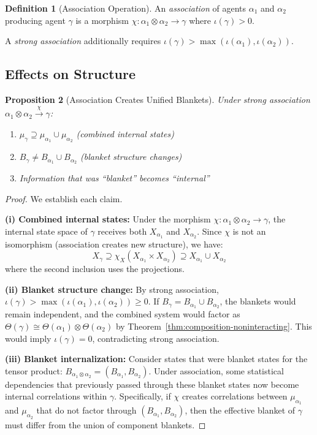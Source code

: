 \documentclass[11pt,a4paper]{article}
\theoremstyle{definition}
\newtheorem{definition}{Definition}[section]
\theoremstyle{plain}
\newtheorem{proposition}[definition]{Proposition}
\theoremstyle{remark}
\begin{document}
\begin{definition}[Association Operation]\label{def:association-op}
An \emph{association} of agents $\alpha_1$ and $\alpha_2$ producing agent $\gamma$ is a morphism $\chi: \alpha_1 \otimes \alpha_2 \to \gamma$ where $\iota(\gamma) > 0$.

A \emph{strong association} additionally requires $\iota(\gamma) > \max(\iota(\alpha_1), \iota(\alpha_2))$.
\end{definition}

\subsection{Effects on Structure}

\begin{proposition}[Association Creates Unified Blankets]\label{prop:blanket-merging}
Under strong association $\alpha_1 \otimes \alpha_2 \xrightarrow{\chi} \gamma$:
\begin{enumerate}[label=(\roman*)]
    \item $\mu_\gamma \supseteq \mu_{\alpha_1} \cup \mu_{\alpha_2}$ (combined internal states)
    \item $B_\gamma \neq B_{\alpha_1} \cup B_{\alpha_2}$ (blanket structure changes)
    \item Information that was ``blanket'' becomes ``internal''
\end{enumerate}
\end{proposition}

\begin{proof}
We establish each claim.

\textbf{(i) Combined internal states:} Under the morphism $\chi: \alpha_1 \otimes \alpha_2 \to \gamma$, the internal state space of $\gamma$ receives both $X_{\alpha_1}$ and $X_{\alpha_2}$. Since $\chi$ is not an isomorphism (association creates new structure), we have:
\[
X_\gamma \supseteq \chi_X(X_{\alpha_1} \times X_{\alpha_2}) \supseteq X_{\alpha_1} \cup X_{\alpha_2}
\]
where the second inclusion uses the projections.

\textbf{(ii) Blanket structure change:} By strong association, $\iota(\gamma) > \max(\iota(\alpha_1), \iota(\alpha_2)) \geq 0$. If $B_\gamma = B_{\alpha_1} \cup B_{\alpha_2}$, the blankets would remain independent, and the combined system would factor as $\Theta(\gamma) \cong \Theta(\alpha_1) \otimes \Theta(\alpha_2)$ by Theorem~\ref{thm:composition-noninteracting}. This would imply $\iota(\gamma) = 0$, contradicting strong association.

\textbf{(iii) Blanket internalization:} Consider states that were blanket states for the tensor product: $B_{\alpha_1 \otimes \alpha_2} = (B_{\alpha_1}, B_{\alpha_2})$. Under association, some statistical dependencies that previously passed through these blanket states now become internal correlations within $\gamma$. Specifically, if $\chi$ creates correlations between $\mu_{\alpha_1}$ and $\mu_{\alpha_2}$ that do not factor through $(B_{\alpha_1}, B_{\alpha_2})$, then the effective blanket of $\gamma$ must differ from the union of component blankets.
\end{proof}
\end{document}
